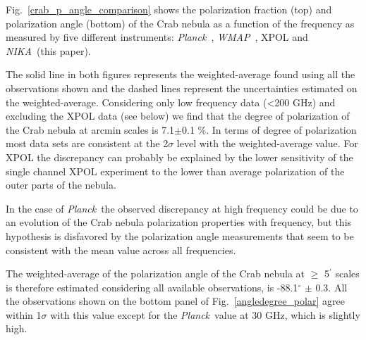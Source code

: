 \documentclass[twocolumn,traditabstract]{aa}
\def\NIKA{\textit{NIKA}}
\def\Planck{\textit{Planck}}
\def\WMAP{\textit{WMAP}}
\begin{document}
Fig.~\ref{crab_p_angle_comparison} shows the polarization fraction (top) and polarization angle (bottom) of the Crab nebula as a function of the frequency as measured by
five different instruments: \Planck\ \citep{2015arXiv150702058P},
\WMAP\ \citep{2011ApJS..192...19W}, XPOL \citep{aumont2010} and \NIKA\ (this paper).  

The solid line in both figures represents the weighted-average found using all
the observations shown and the dashed lines represent the uncertainties
estimated on the weighted-average. Considering only low frequency data
(\textless 200 GHz) and excluding the XPOL data (see below) we find that the
degree of polarization of the Crab nebula at arcmin scales is 7.1$\pm$0.1 \%.
In terms of degree of polarization most data sets are consistent at the
2$\sigma$ level with the weighted-average value. For XPOL the discrepancy can
probably be explained by the lower sensitivity of the single channel XPOL
experiment to the lower than average polarization of the outer parts of the
nebula.

In the case of \Planck\, the observed discrepancy at high frequency could be due
to an evolution of the Crab nebula polarization properties with frequency, but
this hypothesis is disfavored by the polarization angle measurements that seem
to be consistent with the mean value across all frequencies.

The weighted-average of the polarization angle of the Crab nebula at $\geq$ 5$^{\prime}$ scales is therefore estimated considering all available observations, is -88.1$^{\circ}$
$\pm$ 0.3.  All the observations shown on the bottom panel of
Fig.~\ref{angledegree_polar} agree within 1$\sigma$ with this value except for
the \Planck\ value at 30 GHz, which is slightly high.
\end{document}
